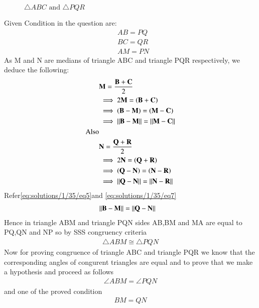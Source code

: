 \begin{figure}[hb]
	\centering
	\centering
	\resizebox{\columnwidth}{!}{}
	\caption{$\triangle ABC \text{ and } \triangle PQR$}
	\label{eq:solutions/1/35/myfig}
\end{figure}
Given Condition in the question are:
\begin{align}
&AB = PQ\label{eq:solutions/1/35/eq1} \\
&BC = QR\label{eq:solutions/1/35/eq2} \\
&AM = PN\label{eq:solutions/1/35/eq3}
\end{align}
As M and N are medians of triangle ABC and triangle PQR respectively, we deduce the following:
\begin{align}
&\mathbf{M} = \frac{\mathbf{B}+\mathbf{C}}{2} \\
&\implies 2\mathbf{M} = \left(\mathbf{B+C}\right)\\
&\implies\left(\mathbf{B-M}\right) = \left(\mathbf{M-C}\right)\\
&\implies\left\lVert\mathbf{B}-\mathbf{M}\right\rVert=\left\lVert\mathbf{M}-\mathbf{C}\right\rVert\label{eq:solutions/1/35/eq5} \\
\text{Also}\\
&\mathbf{N} = \frac{\mathbf{Q}+\mathbf{R}}{2}\label{eq:solutions/1/35/eq6} \\
&\implies2\mathbf{N} = \left(\mathbf{Q+R}\right)\\
&\implies\left(\mathbf{Q-N}\right) = \left(\mathbf{N-R}\right)\\
&\implies\left\lVert\mathbf{Q}-\mathbf{N}\right\rVert=\left\lVert\mathbf{N}-\mathbf{R}\right\rVert\label{eq:solutions/1/35/eq7}
\end{align}
Refer\eqref{eq:solutions/1/35/eq5}and \eqref{eq:solutions/1/35/eq7}
\begin{align}
&\left\lVert\mathbf{B}-\mathbf{M}\right\rVert= \left\lVert\mathbf{Q}-\mathbf{N}\right\rVert
\end{align}
Hence in triangle ABM and triangle PQN sides AB,BM and MA are equal to PQ,QN and NP so by SSS congruency criteria 
\begin{align}
    \triangle{ABM}\cong\triangle{PQN}\label{eq:solutions/1/35/eqA}
\end{align}
Now for proving congruence of triangle ABC and triangle PQR we know that the corresponding angles of congurent triangles are equal and to prove that we make a hypothesis and proceed as follows
\begin{align}
\angle ABM = \angle PQN\label{eq:solutions/1/35/eq8} 
\end{align} 
and one of the proved condition
\begin{align}
  BM=QN\label{eq:solutions/1/35/eq9}  
\end{align}
